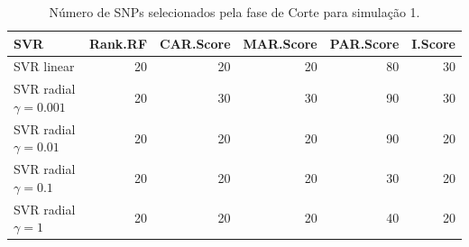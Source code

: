 \begin{table}[ht]
\centering
\begin{tabular}{lrrrrr}
  \hline
SVR & Rank.RF & CAR.Score & MAR.Score & PAR.Score & I.Score \\ 
  \hline
SVR linear & 20 & 20 & 20 & 80 & 30 \\ 
  SVR radial $\gamma = 0.001$ & 20 & 30 & 30 & 90 & 30 \\ 
  SVR radial $\gamma = 0.01$ & 20 & 20 & 20 & 90 & 20 \\ 
  SVR radial $\gamma = 0.1$ & 20 & 20 & 20 & 30 & 20 \\ 
  SVR radial $\gamma = 1$ & 20 & 20 & 20 & 40 & 20 \\ 
   \hline
\end{tabular}
\caption{Número de SNPs selecionados pela fase de Corte para simulação 1.} 
\end{table}
